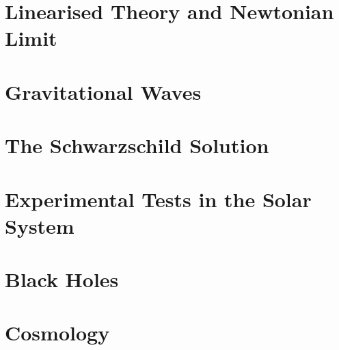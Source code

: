 \documentclass[
a4paper,                                               %
oneside,                                               %
12pt,                                                  %
headsepline,                                           %
xcolor=dvipsnames
]{scrreprt}
\begin{document}
\chapter{Linearised Theory and Newtonian Limit}
\chapter{Gravitational Waves}
\chapter{The Schwarzschild Solution}
\chapter{Experimental Tests in the Solar System}
\chapter{Black Holes}
\chapter{Cosmology}
\end{document}
